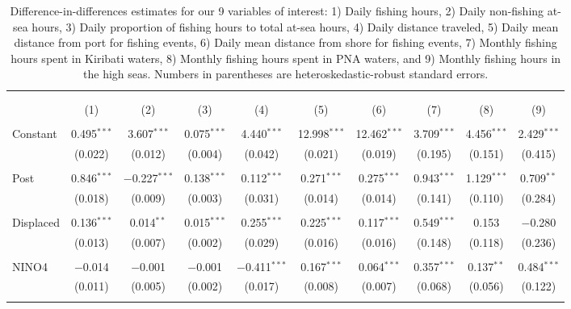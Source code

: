 
\begin{table}[H] \centering 
  \caption{\label{tab:main_DID}Difference-in-differences estimates for our 9 variables of interest: 1) Daily fishing hours, 2) Daily non-fishing at-sea hours, 3) Daily proportion of fishing hours to total at-sea hours, 4) Daily distance traveled, 5) Daily mean distance from port for fishing events, 6) Daily mean distance from shore for fishing events, 7) Monthly fishing hours spent in Kiribati waters, 8) Monthly fishing hours spent in PNA waters, and 9) Monthly fishing hours in the high seas. Numbers in parentheses are heteroskedastic-robust standard errors.} 
  \label{} 
\footnotesize 
\begin{tabular}{@{\extracolsep{1pt}}lccccccccc} 
\\[-1.8ex]\hline 
\hline \\[-1.8ex] 
\\[-1.8ex] & (1) & (2) & (3) & (4) & (5) & (6) & (7) & (8) & (9)\\ 
\hline \\[-1.8ex] 
 Constant & 0.495$^{***}$ & 3.607$^{***}$ & 0.075$^{***}$ & 4.440$^{***}$ & 12.998$^{***}$ & 12.462$^{***}$ & 3.709$^{***}$ & 4.456$^{***}$ & 2.429$^{***}$ \\ 
  & (0.022) & (0.012) & (0.004) & (0.042) & (0.021) & (0.019) & (0.195) & (0.151) & (0.415) \\ 
  & & & & & & & & & \\ 
 Post & 0.846$^{***}$ & $-$0.227$^{***}$ & 0.138$^{***}$ & 0.112$^{***}$ & 0.271$^{***}$ & 0.275$^{***}$ & 0.943$^{***}$ & 1.129$^{***}$ & 0.709$^{**}$ \\ 
  & (0.018) & (0.009) & (0.003) & (0.031) & (0.014) & (0.014) & (0.141) & (0.110) & (0.284) \\ 
  & & & & & & & & & \\ 
 Displaced & 0.136$^{***}$ & 0.014$^{**}$ & 0.015$^{***}$ & 0.255$^{***}$ & 0.225$^{***}$ & 0.117$^{***}$ & 0.549$^{***}$ & 0.153 & $-$0.280 \\ 
  & (0.013) & (0.007) & (0.002) & (0.029) & (0.016) & (0.016) & (0.148) & (0.118) & (0.236) \\ 
  & & & & & & & & & \\ 
 NINO4 & $-$0.014 & $-$0.001 & $-$0.001 & $-$0.411$^{***}$ & 0.167$^{***}$ & 0.064$^{***}$ & 0.357$^{***}$ & 0.137$^{**}$ & 0.484$^{***}$ \\ 
  & (0.011) & (0.005) & (0.002) & (0.017) & (0.008) & (0.007) & (0.068) & (0.056) & (0.122) \\ 
  & & & & & & & & & \\ 

\end{tabular}
\end{table}
